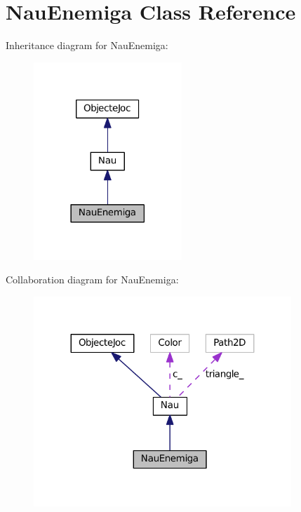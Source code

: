 \hypertarget{class_nau_enemiga}{}\section{Nau\+Enemiga Class Reference}
\label{class_nau_enemiga}


Inheritance diagram for Nau\+Enemiga\+:\nopagebreak
\begin{figure}[H]
\begin{center}
\leavevmode
\includegraphics[width=158pt]{class_nau_enemiga__inherit__graph}
\end{center}
\end{figure}


Collaboration diagram for Nau\+Enemiga\+:\nopagebreak
\begin{figure}[H]
\begin{center}
\leavevmode
\includegraphics[width=275pt]{class_nau_enemiga__coll__graph}
\end{center}
\end{figure}
